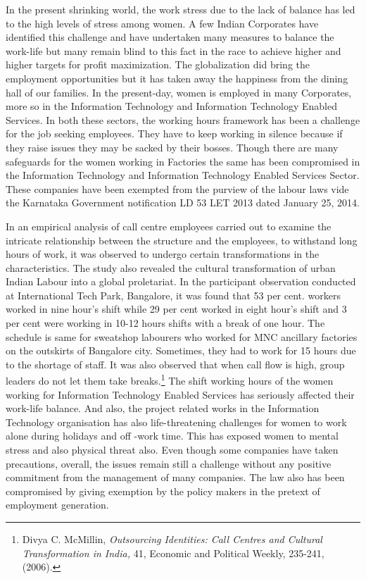 \begin{multicols}{2}

\noi
In the present shrinking world, the work stress due to the lack of balance has led to the high
levels of stress among women. A few Indian Corporates have identified this challenge and
have undertaken many measures to balance the work-life but many remain blind to this fact
in the race to achieve higher and higher targets for profit maximization. The globalization did
bring the employment opportunities but it has taken away the happiness from the dining hall
of our families. In the present-day, women is employed in many Corporates, more so in the
Information Technology and Information Technology Enabled Services. In both these
sectors, the working hours framework has been a challenge for the job seeking employees.
They have to keep working in silence because if they raise issues they may be sacked by their
bosses. Though there are many safeguards for the women working in Factories the same has
been compromised in the Information Technology and Information Technology Enabled
Services Sector. These companies have been exempted from the purview of the labour laws
vide the Karnataka Government notification LD 53 LET 2013 dated January 25, 2014.


\noi
In an empirical analysis of call centre employees carried out to examine the intricate
relationship between the structure and the employees, to withstand long hours of work, it was
observed to undergo certain transformations in the characteristics. The study also revealed the 
cultural transformation of urban Indian Labour into a global proletariat. In the participant
observation conducted at International Tech Park, Bangalore, it was found that 53 per cent.
workers worked in nine hour’s shift while 29 per cent worked in eight hour’s shift and 3 per
cent were working in 10-12 hours shifts with a break of one hour. The schedule is same for
sweatshop labourers who worked for MNC ancillary factories on the outskirts of Bangalore
city. Sometimes, they had to work for 15 hours due to the shortage of staff. It was also
observed that when call flow is high, group leaders do not let them take breaks.\footnote{Divya C. McMillin, \textit{Outsourcing Identities: Call Centres and Cultural Transformation in India,} 41, Economic and Political Weekly, 235-241, (2006).} The shift
working hours of the women working for Information Technology Enabled Services has
seriously affected their work-life balance. And also, the project related works in the
Information Technology organisation has also life-threatening challenges for women to work
alone during holidays and off -work time. This has exposed women to mental stress and also
physical threat also. Even though some companies have taken precautions, overall, the issues
remain still a challenge without any positive commitment from the management of many
companies. The law also has been compromised by giving exemption by the policy makers in
the pretext of employment generation.


\end{multicols}
